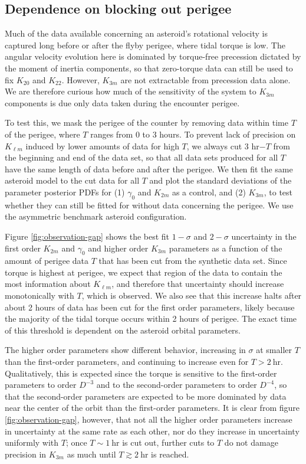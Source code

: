 \documentclass{aastex631}
\newcommand{\siunit}[1]{\ \textrm{#1}}
\begin{document}
\subsection{Dependence on blocking out perigee}
\label{sec:block-perigee}
Much of the data available concerning an asteroid's rotational velocity is captured long before or after the flyby perigee, where tidal torque is low. The angular velocity evolution here is dominated by torque-free precession dictated by the moment of inertia components, so that zero-torque data can still be used to fix $K_{20}$ and $K_{22}$. However, $K_{3m}$ are not extractable from precession data alone. We are therefore curious how much of the sensitivity of the system to $K_{3m}$ components is due only data taken during the encounter perigee.

To test this, we mask the perigee of the counter by removing data within time $T$ of the perigee, where $T$ ranges from 0 to 3 hours. To prevent lack of precision on $K_{\ell m}$ induced by lower amounts of data for high $T$, we always cut 3 hr$-T$ from the beginning and end of the data set, so that all data sets produced for all $T$ have the same length of data before and after the perigee. We then fit the same asteroid model to the cut data for all $T$ and plot the standard deviations of the parameter posterior PDFs for (1) $\gamma_0$ and $K_{2m}$ as a control, and (2) $K_{3m}$, to test whether they can still be fitted for without data concerning the perigee. We use the asymmetric benchmark asteroid configuration.

Figure \ref{fig:observation-gap} shows the best fit $1-\sigma$ and $2-\sigma$ uncertainty in the first order $K_{2m}$ and $\gamma_0$ and higher order $K_{3m}$ parameters as a function of the amount of perigee data $T$ that has been cut from the synthetic data set. Since torque is highest at perigee, we expect that region of the data to contain the most information about $K_{\ell m}$, and therefore that uncertainty should increase monotonically with $T$, which is observed. We also see that this increase halts after about 2 hours of data has been cut for the first order parameters, likely because the majority of the tidal torque occurs within 2 hours of perigee. The exact time of this threshold is dependent on the asteroid orbital parameters.

The higher order parameters show different behavior, increasing in $\sigma$ at smaller $T$ than the first-order parameters, and continuing to increase even for $T>2\siunit{hr}$. Qualitatively, this is expected since the torque is sensitive to the first-order parameters to order $D^{-3}$ and to the second-order parameters to order $D^{-4}$, so that the second-order parameters are expected to be more dominated by data near the center of the orbit than the first-order parameters. It is clear from figure \ref{fig:observation-gap}, however, that not all the higher order parameters increase in uncertainty at the same rate as each other, nor do they increase in uncertainty uniformly with $T$; once $T\sim 1 \siunit{hr}$ is cut out, further cuts to $T$ do not damage precision in $K_{3m}$ as much until $T\gtrsim 2\siunit{hr}$ is reached.
\end{document}
